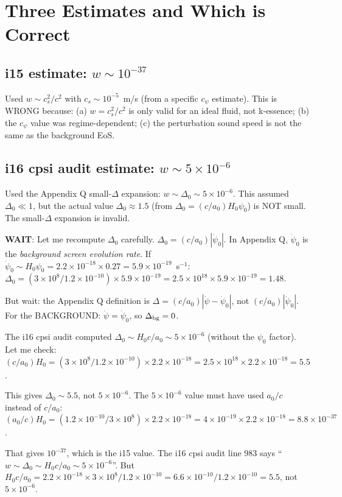 \documentclass[11pt]{article}
\newcommand{\ee}[1]{\times 10^{#1}}
\begin{document}
\section{Three Estimates and Which is Correct}

\subsection{i15 estimate: $w \sim 10^{-37}$}

Used $w \sim c_s^2/c^2$ with $c_s \sim 10^{-5}$~m/s (from a specific
$c_\psi$ estimate). This is WRONG because: (a) $w = c_s^2/c^2$ is only
valid for an ideal fluid, not k-essence; (b) the $c_\psi$ value was
regime-dependent; (c) the perturbation sound speed is not the same as
the background EoS.

\subsection{i16 cpsi audit estimate: $w \sim 5\ee{-6}$}

Used the Appendix Q small-$\Delta$ expansion: $w \sim \Delta_0 \sim 5\ee{-6}$.
This assumed $\Delta_0 \ll 1$, but the actual value $\Delta_0 \approx 1.5$
(from $\Delta_0 = (c/a_0)H_0\psi_0$) is NOT small. The small-$\Delta$
expansion is invalid.

\textbf{WAIT}: Let me recompute $\Delta_0$ carefully.
$\Delta_0 = (c/a_0)|\dot\psi_0|$. In Appendix Q, $\dot\psi_0$ is
the \emph{background screen evolution rate}. If $\dot\psi_0 \sim H_0 \psi_0
= 2.2\ee{-18} \times 0.27 = 5.9\ee{-19}$~s$^{-1}$:
$\Delta_0 = (3\ee{8}/1.2\ee{-10}) \times 5.9\ee{-19}
= 2.5\ee{18} \times 5.9\ee{-19} = 1.48$.

But wait: the Appendix Q definition is $\Delta = (c/a_0)|\dot\psi - \dot\psi_0|$,
not $(c/a_0)|\dot\psi_0|$. For the BACKGROUND: $\dot\psi = \dot\psi_0$,
so $\Delta_{\rm bg} = 0$.

The i16 cpsi audit computed $\Delta_0 \sim H_0 c/a_0 \sim 5\ee{-6}$
(without the $\psi_0$ factor). Let me check:
$(c/a_0)H_0 = (3\ee{8}/1.2\ee{-10}) \times 2.2\ee{-18}
= 2.5\ee{18} \times 2.2\ee{-18} = 5.5$.

This gives $\Delta_0 \sim 5.5$, not $5\ee{-6}$. The $5\ee{-6}$ value
must have used $a_0/c$ instead of $c/a_0$:
$(a_0/c)H_0 = (1.2\ee{-10}/3\ee{8}) \times 2.2\ee{-18}
= 4\ee{-19} \times 2.2\ee{-18} = 8.8\ee{-37}$.

That gives $10^{-37}$, which is the i15 value. The i16 cpsi audit
line 983 says ``$w \sim \Delta_0 \sim H_0 c/a_0 \sim 5\ee{-6}$''.
But $H_0 c / a_0 = 2.2\ee{-18} \times 3\ee{8} / 1.2\ee{-10}
= 6.6\ee{-10}/1.2\ee{-10} = 5.5$, not $5\ee{-6}$.
\end{document}

